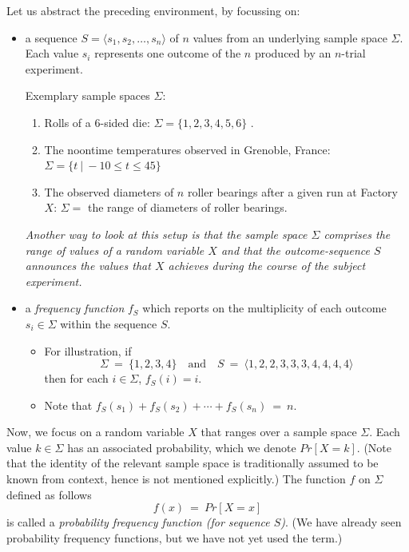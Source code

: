 Let us abstract the preceding environment, by focussing on:
\begin{itemize}
\item
a sequence $S = \langle s_1, s_2, \ldots, s_n \rangle$ of $n$ values
from an underlying sample space $\Sigma$.  Each value $s_i$ represents
one outcome of the $n$ produced by an $n$-trial experiment.

\smallskip

Exemplary sample spaces $\Sigma$:
  \begin{enumerate}
  \item
Rolls of a $6$-sided die: $\Sigma = \{1, 2, 3, 4, 5, 6\}$ .
  \item
The noontime temperatures observed in Grenoble, France:
$\Sigma = \{ t \ | \ -10 \leq t \leq 45\}$
  \item
The observed diameters of $n$ roller bearings after a given run at Factory $X$:
$\Sigma =$ the range of diameters of roller bearings.
\end{enumerate}

{\em Another way to look at this setup is that the sample space
  $\Sigma$ comprises the range of values of a random variable $X$ and
  that the outcome-sequence $S$ announces the values that $X$ achieves
  during the course of the subject experiment.}

\item
a {\it frequency function} $f_S$ which reports on the multiplicity of each outcome
$s_i \in \Sigma$ within the sequence $S$.
  \begin{itemize}
  \item
For illustration, if 
\begin{equation}
\label{eq:sample-seq-10}
\Sigma \ = \  \{1, 2, 3, 4\} \ \ \ \mbox{ and } \ \ \
S \ = \ \langle 1, 2, 2, 3, 3, 3, 4, 4, 4, 4 \rangle
\end{equation}
then for each $i \in \Sigma$, $f_S(i) = i$.
  \item
Note that $f_S(s_1) + f_S(s_2) + \cdots + f_S(s_n) \ = \ n$.
  \end{itemize}
\end{itemize}

\smallskip


Now, we focus on a random variable $X$ that ranges over a sample space $\Sigma$.  
Each value $k \in \Sigma$ has an associated probability, which we denote $Pr[X=k]$.  
(Note that the identity of the relevant sample space is traditionally assumed to be known
from context, hence is not mentioned explicitly.)
The function $f$ on $\Sigma$ defined as follows
\[ f(x) \ = \ Pr[X=x] \]
is called a {\it probability frequency function (for sequence $S$)}.
(We have already seen probability frequency functions, but we have
not yet used the term.)

